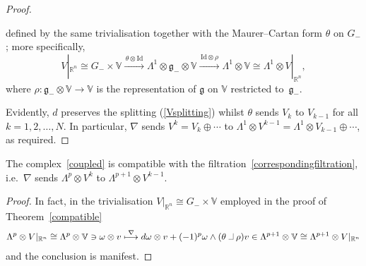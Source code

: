 \documentclass[pdftex]{sigma}
\newcommand{\intprod}{\;\rule{5pt}{.3pt}\rule{.3pt}{7pt}\;}
\begin{document}
\begin{proof}
\begin{itemize}
def\/ined by the same trivialisation together with the Maurer--Cartan form
$\theta$ on $G_-$; more specif\/ically,
\[V|_{{\mathbb{R}}^n}\cong
G_-\times{\mathbb{V}}\xrightarrow{\,\theta\otimes{\mathrm{Id}}\,}
\Lambda^1\otimes{\mathfrak{g}}_-\otimes{\mathbb{V}}
\xrightarrow{\,{\mathrm{Id}}\otimes\rho\,}\Lambda^1\otimes{\mathbb{V}}\cong
\Lambda^1\otimes V|_{{\mathbb{R}}^n},\]
where $\rho:{\mathfrak{g}}_-\otimes{\mathbb{V}}\to{\mathbb{V}}$ is the
representation of ${\mathfrak{g}}$ on ${\mathbb{V}}$ restricted
to~${\mathfrak{g}}_-$.
\end{itemize}
Evidently, $d$ preserves the splitting (\ref{Vsplitting}) whilst $\theta$
sends $V_k$ to $V_{k-1}$ for all $k=1,2,\ldots, N$. In particular, $\nabla$
sends $V^k=V_k\oplus\cdots$ to
$\Lambda^1\otimes V^{k-1}=\Lambda^1\otimes V_{k-1}\oplus\cdots$, as required.
\end{proof}

\begin{corollary}\label{easypeasy}
The complex~\eqref{coupled} is compatible with the
filtration~\eqref{correspondingfiltration}, i.e.~$\nabla$ sends
$\Lambda^p\otimes V^k$ to $\Lambda^{p+1}\otimes V^{k-1}$.
\end{corollary}

\begin{proof} In fact, in the trivialisation $V|_{{\mathbb{R}}^n}\cong
G_-\times{\mathbb{V}}$ employed in the proof of Theorem~\ref{compatible}
\begin{gather*}
\Lambda^p\otimes V|_{{\mathbb{R}}^n}\cong\Lambda^p\otimes{\mathbb{V}}\ni
\omega\otimes v\stackrel{\nabla}{\longmapsto}
d\omega\otimes v+(-1)^p\omega\wedge(\theta\intprod\rho)v\in
\Lambda^{p+1}\otimes{\mathbb{V}}\cong\Lambda^{p+1}\otimes V|_{{\mathbb{R}}^n}
\end{gather*}
and the conclusion is manifest.\end{proof}
\end{document}
